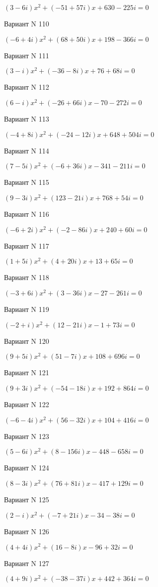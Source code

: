 \documentclass[11pt]{report}
\begin{document}
$(3 - 6 i)x^2 + (-51 + 57 i)x + 630 - 225 i = 0$

Вариант N 110

$(-6 + 4 i)x^2 + (68 + 50 i)x + 198 - 366 i = 0$

Вариант N 111

$(3 - i)x^2 + (-36 - 8 i)x + 76 + 68 i = 0$

Вариант N 112

$(6 - i)x^2 + (-26 + 66 i)x  -70 - 272 i = 0$

Вариант N 113

$(-4 + 8 i)x^2 + (-24 - 12 i)x + 648 + 504 i = 0$

Вариант N 114

$(7 - 5 i)x^2 + (-6 + 36 i)x  -341 - 211 i = 0$

Вариант N 115

$(9 - 3 i)x^2 + (123 - 21 i)x + 768 + 54 i = 0$

Вариант N 116

$(-6 + 2 i)x^2 + (-2 - 86 i)x + 240 + 60 i = 0$

Вариант N 117

$(1 + 5 i)x^2 + (4 + 20 i)x + 13 + 65 i = 0$

Вариант N 118

$(-3 + 6 i)x^2 + (3 - 36 i)x  -27 - 261 i = 0$

Вариант N 119

$(-2 + i)x^2 + (12 - 21 i)x  -1 + 73 i = 0$

Вариант N 120

$(9 + 5 i)x^2 + (51 - 7 i)x + 108 + 696 i = 0$

Вариант N 121

$(9 + 3 i)x^2 + (-54 - 18 i)x + 192 + 864 i = 0$

Вариант N 122

$(-6 - 4 i)x^2 + (56 - 32 i)x + 104 + 416 i = 0$

Вариант N 123

$(5 - 6 i)x^2 + (8 - 156 i)x  -448 - 658 i = 0$

Вариант N 124

$(8 - 3 i)x^2 + (76 + 81 i)x  -417 + 129 i = 0$

Вариант N 125

$(2 - i)x^2 + (-7 + 21 i)x  -34 - 38 i = 0$

Вариант N 126

$(4 + 4 i)x^2 + (16 - 8 i)x  -96 + 32 i = 0$

Вариант N 127

$(4 + 9 i)x^2 + (-38 - 37 i)x + 442 + 364 i = 0$
\end{document}
